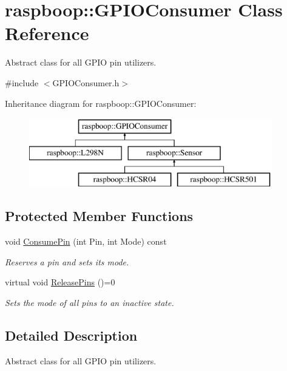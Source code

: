 \hypertarget{classraspboop_1_1GPIOConsumer}{\section{raspboop\-:\-:G\-P\-I\-O\-Consumer Class Reference}
\label{classraspboop_1_1GPIOConsumer}
}


Abstract class for all G\-P\-I\-O pin utilizers.  




{\ttfamily \#include $<$G\-P\-I\-O\-Consumer.\-h$>$}

Inheritance diagram for raspboop\-:\-:G\-P\-I\-O\-Consumer\-:\begin{figure}[H]
\begin{center}
\leavevmode
\includegraphics[height=3.000000cm]{classraspboop_1_1GPIOConsumer}
\end{center}
\end{figure}
\subsection*{Protected Member Functions}
\begin{DoxyCompactItemize}
\item 
void \hyperlink{classraspboop_1_1GPIOConsumer_a066938a39a4f34ed2cfee05a593008e6}{Consume\-Pin} (int Pin, int Mode) const 
\begin{DoxyCompactList}\small\item\em Reserves a pin and sets its mode. \end{DoxyCompactList}\item 
virtual void \hyperlink{classraspboop_1_1GPIOConsumer_a97b06b9afddfb338fb87cb7338c910de}{Release\-Pins} ()=0
\begin{DoxyCompactList}\small\item\em Sets the mode of all pins to an inactive state. \end{DoxyCompactList}\end{DoxyCompactItemize}


\subsection{Detailed Description}
Abstract class for all G\-P\-I\-O pin utilizers. 

